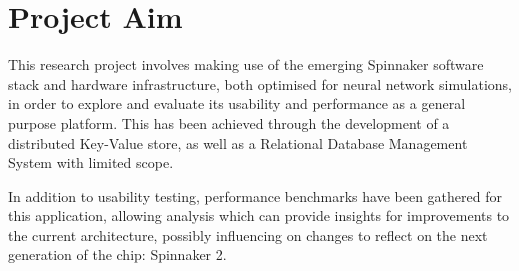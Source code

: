 \section{Project Aim}
\label{sec:aim}

This research project involves making use of the emerging Spinnaker software stack and hardware infrastructure, both optimised for neural network simulations, in order to explore and evaluate its usability and performance as a general purpose platform. This has been achieved through the development of a distributed Key-Value store, as well as a Relational Database Management System with limited scope.

In addition to usability testing, performance benchmarks have been gathered for this application, allowing analysis which can provide insights for improvements to the current architecture, possibly influencing on changes to reflect on the next generation of the chip: Spinnaker 2.